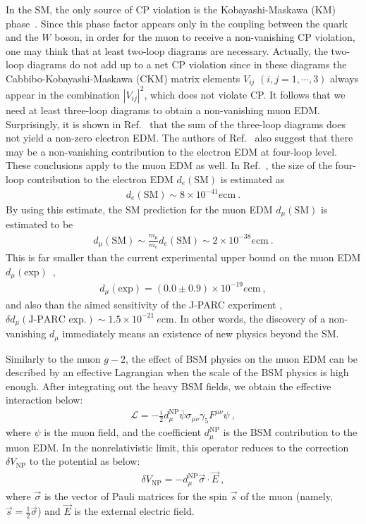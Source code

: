 In the SM, the only source of CP violation is
the Kobayashi-Maskawa (KM) phase~\cite{Kobayashi:1973fv}.
Since this phase factor appears only in the coupling between
the quark and the $W$ boson, in order for the muon to receive a 
non-vanishing CP violation, one may think that at least
two-loop diagrams are necessary.  Actually, the two-loop
diagrams do not add up to a net CP violation since in these
diagrams the Cabbibo-Kobayashi-Maskawa (CKM) matrix elements $V_{ij}$
$(i,j= 1,\cdots, 3)$ always appear in the combination $|V_{ij}|^2$,
which does not violate CP.  It follows that we need
at least three-loop diagrams to obtain a non-vanishing muon EDM.  
Surprisingly, it is shown in Ref.~\cite{Pospelov:1991zt} that
the sum of the three-loop diagrams does not yield a non-zero
electron EDM.  The authors of Ref.~\cite{Pospelov:1991zt}
also suggest that there may be a non-vanishing contribution
to the electron EDM at four-loop level.
These conclusions apply to the muon EDM as well.
In Ref.~\cite{Booth:1993af}, the size of the four-loop
contribution to the electron EDM $d_e(\text{SM})$ is estimated as 
%
\begin{align}
 d_e(\text{SM}) \sim 8 \times 10^{-41} e {\text{cm}}~.
\end{align}
%
By using this estimate, the SM prediction for
the muon EDM $d_\mu(\text{SM})$ is estimated to be
%
\begin{align}
 d_\mu(\text{SM}) \sim \frac{m_\mu}{m_e} d_e(\text{SM})
\sim 2 \times 10^{-38} e {\text{cm}}~.
\end{align}
%
This is far smaller than the current experimental 
upper bound on the muon EDM $d_\mu(\text{exp})$~\cite{Bennett:2008dy},
%
\begin{align}
 d_\mu(\text{exp}) = (0.0\pm 0.9) \times 10^{-19}  e {\text{cm}}~,
\end{align}
%
and also than the aimed sensitivity of the J-PARC 
experiment \cite{TDRsummarypaper}, 
$\delta d_\mu(\text{J-PARC exp.}) \sim 1.5 
\times 10^{-21} ~ e {\text{cm}}$.   In other words,
the discovery of a non-vanishing $d_\mu$ immediately
means an existence of new physics beyond the SM.

Similarly to the muon $g-2$, the effect of BSM physics
on the muon EDM can be described by an effective
Lagrangian when the scale of the BSM physics is high enough.
After integrating out the heavy BSM fields,
we obtain the effective interaction below:
%
\begin{align}
 {\mathcal L} = - \frac{i}{2} d_\mu^{\text{NP}}
 \overline{\psi} \sigma_{\mu\nu} \gamma_5 F^{\mu\nu} \psi ~,
\label{eq:effL_EDM}
\end{align}
%
where $\psi$ is the muon field, and the coefficient
$d_\mu^{\text{NP}}$ is the BSM contribution to the muon EDM.
In the nonrelativistic limit, this operator reduces to the
correction $\delta V_{\text{NP}}$ to the potential as below:
%
\begin{align}
 \delta V_{\text{NP}} 
  = - d_\mu^{\text{NP}} \vec{\sigma} \cdot \vec{E}~,
\end{align}
%
where $\vec{\sigma}$ is the vector of Pauli matrices
for the spin $\vec{s}$ of the muon (namely, 
$\vec{s}= \frac12 \vec{\sigma}$) and $\vec{E}$ is
the external electric field. 

